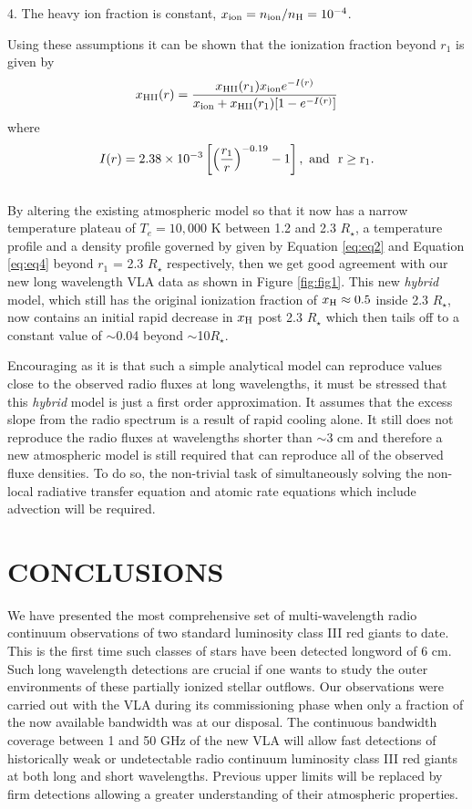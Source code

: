 \documentclass[iop]{emulateapj}
\begin{document}
\item 4. The heavy ion fraction is constant, $x_{\rm{ion}}=n_{\rm{ion}}/n_{\rm{H}}=10^{-4}$.
\item Using these assumptions it can be shown that the ionization fraction beyond $r_{1}$ is given by \citep{1986ApJ...306..605G}
\begin{equation}
x_{\rm{HII}}(r)= \frac{x_{\rm{HII}}(r_1)x_{\rm{ion}}e^{-I(r)}}{x_{\rm{ion}}+x_{\rm{HII}}(r_1)[1 - e^{-I(r)}]}
\label{eq:eq4}
\end{equation}
where
\begin{equation}
I(r) = 2.38 \times 10^{-3} \left[\left( \frac{r_{1}}{r}\right)^{-0.19} -1 \right], \ \rm{and} \ \  r \geq r_{1}.
\label{eq:eq5}
\end{equation}
\\
By altering the existing atmospheric model so that it now has a narrow temperature  plateau of $T_e = 10,000$ K between 1.2 and 2.3 $R_{\star}$, a temperature profile and a density profile governed by given by Equation \ref{eq:eq2}  and Equation \ref{eq:eq4} beyond $r_{1}$ = 2.3 $R_{\star}$ respectively, then we get  good agreement with our new long wavelength VLA data as shown in Figure \ref{fig:fig1}. This new \textit{hybrid} model, which still has the original ionization fraction of $x_{\rm{H}} \approx 0.5$ inside 2.3 $R_{\star}$, now contains an  initial rapid decrease in $x_{\rm{H}}$ post 2.3 $R_{\star}$ which then tails off to a constant value of $\sim$0.04 beyond $\sim$10$R_{\star}$.

Encouraging as it is that such a simple analytical model can reproduce values close to the observed radio fluxes at long wavelengths, it must be stressed that this \textit{hybrid} model is just a first order approximation. It assumes that the excess slope from the radio spectrum is a result of rapid cooling alone. It still does not reproduce the radio fluxes at wavelengths shorter than $\sim$3 cm and therefore a new atmospheric model is still required that can reproduce all of the observed fluxe densities. To do so, the non-trivial task of simultaneously solving the non-local radiative transfer equation and atomic rate equations which include advection will be required.

\section{CONCLUSIONS}
We have presented the most comprehensive set of multi-wavelength radio continuum observations of two standard luminosity class III red giants to date. This is the first time such classes of stars have been detected longword of 6 cm. Such long wavelength detections are crucial if one wants to study the outer environments of these partially ionized stellar outflows. Our observations were carried out with the VLA during its commissioning phase when only a fraction of the now available bandwidth was at our disposal. The continuous bandwidth coverage between 1 and 50 GHz of the new VLA will allow fast detections of historically weak or undetectable radio continuum luminosity class III red giants at both long and short wavelengths. Previous upper limits will be replaced by firm detections allowing a greater understanding of their atmospheric properties.
\end{document}
